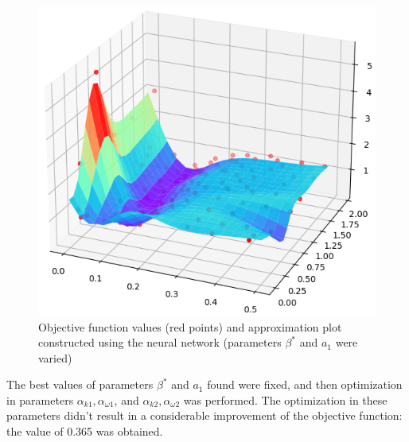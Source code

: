 \documentclass[applsci,article,submit,moreauthors,pdftex]{Definitions/mdpi}
\begin{document}
\begin{figure}[H]
\begin{center}
\includegraphics[width=0.8\linewidth]{NN_100_point_.png}
\caption{Objective function values (red points) and approximation plot constructed using the neural network (parameters $\beta^*$ and $a_1$ were varied)}
\label{NN_100_point}
\end{center}
\end{figure}

The best values of parameters $\beta^*$ and $a_1$ found were fixed, and then optimization in parameters $\alpha_{k1}, \alpha_{\omega1}$, and $\alpha_{k2}, \alpha_{\omega2}$ was performed. 
The optimization in these parameters didn't result in a considerable improvement of the objective function: the value of 0.365 was obtained.


%
%
\end{document}
